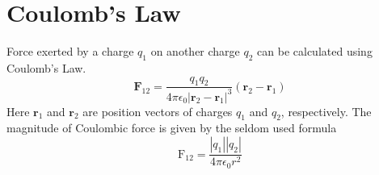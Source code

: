 \documentclass[12pt,a4paper]{article}
\begin{document}
\section{Coulomb's Law}
Force exerted by a charge $q_1$ on another charge $q_2$ can be calculated using Coulomb's Law.
\begin{equation}
\textbf{F}_{12}=\dfrac{q_1q_2}{4\pi\epsilon_0 |\textbf{r}_2-\textbf{r}_1|^3}(\textbf{r}_2-\textbf{r}_1)
\end{equation}
Here $\textbf{r}_1$ and $\textbf{r}_2$ are position vectors of charges $q_1$ and $q_2$, respectively. The magnitude of Coulombic force is given by the seldom used formula
\begin{equation}
\mathrm{F}_{12}=\dfrac{|q_1||q_2|}{4\pi\epsilon_0r^2}
\end{equation}
%
%
\end{document}
